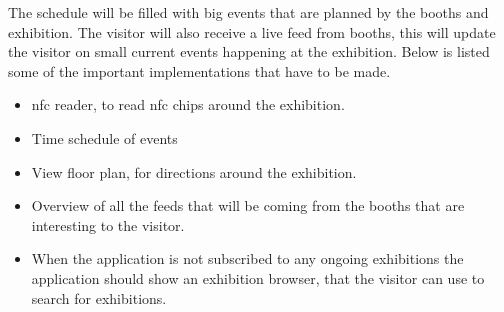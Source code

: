 The schedule will be filled with big events that are planned by the booths and exhibition. The visitor will also receive a live feed from booths, this will update the visitor on small current events happening at the exhibition. Below is listed some of the important implementations that have to be made.
\begin{itemize}
\item \ac{nfc} reader, to read \ac{nfc} chips around the exhibition.
\item Time schedule of events
\item View floor plan, for directions around the exhibition.
\item Overview of all the feeds that will be coming from the booths that are interesting to the visitor.
\item When the application is not subscribed to any ongoing exhibitions the application should show an exhibition browser, that the visitor can use to search for exhibitions.
\end{itemize}